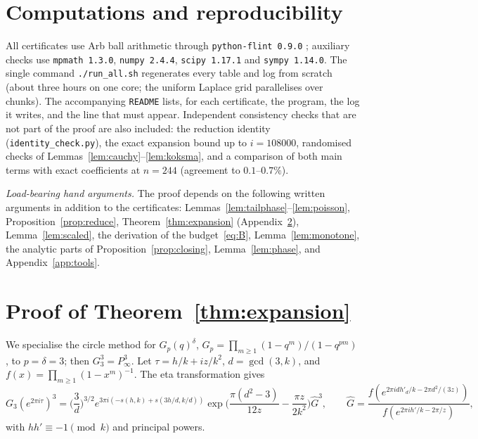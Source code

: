 \documentclass[11pt,reqno]{amsart}
\theoremstyle{plain}
\theoremstyle{definition}
\begin{document}
\section{Computations and reproducibility}\label{sec:computations}

All certificates use Arb ball arithmetic through \texttt{python-flint 0.9.0} \cite{Arb}; auxiliary checks use \texttt{mpmath 1.3.0},
\texttt{numpy 2.4.4}, \texttt{scipy 1.17.1} and \texttt{sympy 1.14.0}. The single command \texttt{./run\_all.sh} regenerates every table
and log from scratch (about three hours on one core; the uniform Laplace grid parallelises over chunks). The accompanying
\texttt{README} lists, for each certificate, the program, the log it writes, and the line that must appear. Independent consistency
checks that are not part of the proof are also included: the reduction identity (\texttt{identity\_check.py}), the exact expansion
bound up to $i=108000$, randomised checks of Lemmas~\ref{lem:cauchy}--\ref{lem:koksma}, and a comparison of both main terms with exact
coefficients at $n=244$ (agreement to $0.1$--$0.7\%$).

\medskip\noindent\emph{Load-bearing hand arguments.} The proof depends on the following written arguments in addition to the certificates:
Lemmas~\ref{lem:tailphase}--\ref{lem:poisson}, Proposition~\ref{prop:reduce}, Theorem~\ref{thm:expansion} (Appendix~\ref{app:expansion}),
Lemma~\ref{lem:scaled}, the derivation of the budget~\eqref{eq:B}, Lemma~\ref{lem:monotone}, the analytic parts of
Proposition~\ref{prop:closing}, Lemma~\ref{lem:phase}, and Appendix~\ref{app:tools}.

\appendix
\section{Proof of Theorem~\ref{thm:expansion}}\label{app:expansion}

We specialise the circle method for $G_p(q)^\delta$, $G_p=\prod_{m\ge1}(1-q^m)/(1-q^{pm})$, to $p=\delta=3$; then $G_3^3=P_\infty^3$.
Let $\tau=h/k+iz/k^2$, $d=\gcd(3,k)$, and $f(x)=\prod_{m\ge1}(1-x^m)^{-1}$. The eta transformation gives
\[
G_3(e^{2\pi i\tau})^3=\Big(\frac3d\Big)^{3/2}e^{3\pi i(-s(h,k)+s(3h/d,k/d))}
\exp\Big(\frac{\pi(d^2-3)}{12z}-\frac{\pi z}{2k^2}\Big)\widehat G^3,\qquad
\widehat G=\frac{f(e^{2\pi i dh'_d/k-2\pi d^2/(3z)})}{f(e^{2\pi ih'/k-2\pi/z})},
\]
with $hh'\equiv-1\pmod k$ and principal powers.
\end{document}
